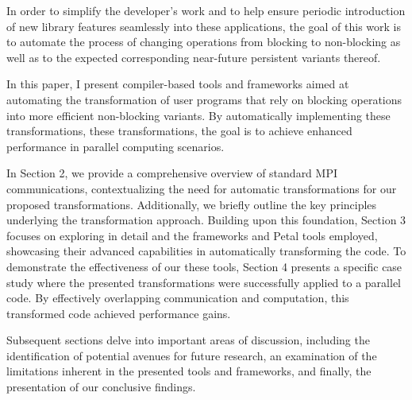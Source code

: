 In order to simplify the developer's work and to help ensure periodic introduction of new library features seamlessly into these applications, the goal of this work is to automate the process of changing operations from blocking to non-blocking as well as to the expected corresponding near-future persistent variants thereof.

In this paper, I present compiler-based tools and frameworks aimed at automating the transformation of user programs that rely on blocking operations into more efficient non-blocking variants. By automatically implementing these transformations, these transformations, the goal is to achieve enhanced performance in parallel computing scenarios.

In Section 2, we provide a comprehensive overview of standard MPI communications, contextualizing the need for automatic transformations for our proposed transformations. Additionally, we briefly outline the key principles underlying the transformation approach. Building upon this foundation, Section 3 focuses on exploring in detail and the frameworks and Petal tools employed, showcasing their advanced capabilities in automatically transforming the code.
To demonstrate the effectiveness of our these tools, Section 4 presents a specific case study  where the presented transformations were successfully applied to a parallel code. By effectively overlapping communication and computation, this transformed code achieved performance gains.

Subsequent sections delve into important areas of discussion, including the identification of potential avenues for future research, an examination of the limitations inherent in the presented tools and frameworks, and finally, the presentation of our conclusive findings.
